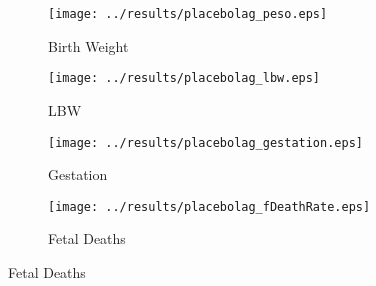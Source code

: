 \documentclass[12pt]{article}
\begin{document}
\begin{spacing}{1.4}
\begin{figure}[htpb!]
  \begin{center}
    \caption{Placebo Tests}
    \label{placebo}
    \begin{subfigure}{.5\textwidth}
      \centering
      \texttt{[image: ../results/placebolag\_peso.eps]}
      \caption{Birth Weight}
      \label{placebo-peso}
    \end{subfigure}%
    \begin{subfigure}{.5\textwidth}
      \centering
      \texttt{[image: ../results/placebolag\_lbw.eps]}
      \caption{LBW}
      \label{placebo-lbw}
    \end{subfigure}
    \begin{subfigure}{.5\textwidth}
      \centering
      \texttt{[image: ../results/placebolag\_gestation.eps]}
      \caption{Gestation}
      \label{placebo-gest}
    \end{subfigure}%
    \begin{subfigure}{.5\textwidth}
      \centering
      \texttt{[image: ../results/placebolag\_fDeathRate.eps]}
      \caption{Fetal Deaths}
      \label{placebo-fdeaths}
    \end{subfigure}
  \end{center}
\end{figure}




\end{spacing}
\end{document}
